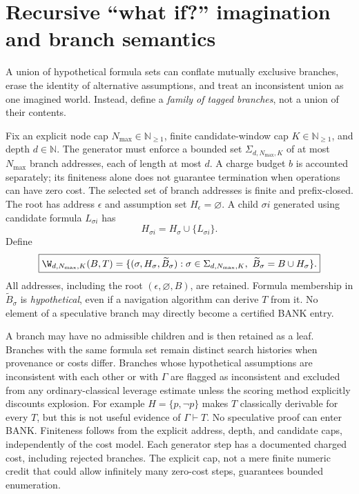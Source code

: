 \section{Recursive ``what if?'' imagination and branch semantics}
A union of hypothetical formula sets can conflate mutually exclusive branches, erase the identity of alternative assumptions, and treat an inconsistent union as one imagined world. Instead, define a \emph{family of tagged branches}, not a union of their contents.
\begin{definition}\label{def:tree}
Fix an explicit node cap $N_{\max}\in\mathbb N_{\ge1}$, finite candidate-window cap $K\in\mathbb N_{\ge1}$, and depth $d\in\mathbb N$. The generator must enforce a bounded set $\Sigma_{d,N_{\max},K}$ of at most $N_{\max}$ branch addresses, each of length at most $d$. A charge budget $b$ is accounted separately; its finiteness alone does not guarantee termination when operations can have zero cost. The selected set of branch addresses is finite and prefix-closed. The root has address $\epsilon$ and assumption set $H_\epsilon=\varnothing$. A child $\sigma i$ generated using candidate formula $L_{\sigma i}$ has
\[H_{\sigma i}=H_\sigma\cup\{L_{\sigma i}\}.\]
Define
\[\boxed{\W_{d,N_{\max},K}(B,T)=\{(\sigma,H_\sigma,\widetilde B_\sigma):\sigma\in\Sigma_{d,N_{\max},K},\ \widetilde B_\sigma=B\cup H_\sigma\}.}\]
All addresses, including the root $(\epsilon,\varnothing,B)$, are retained. Formula membership in $\widetilde B_\sigma$ is \emph{hypothetical}, even if a navigation algorithm can derive $T$ from it. No element of a speculative branch may directly become a certified BANK entry.
\end{definition}
A branch may have no admissible children and is then retained as a leaf. Branches with the same formula set remain distinct search histories when provenance or costs differ. Branches whose hypothetical assumptions are inconsistent with each other or with $\Gamma$ are flagged as inconsistent and excluded from any ordinary-classical leverage estimate unless the scoring method explicitly discounts explosion. For example $H=\{p,\neg p\}$ makes $T$ classically derivable for every $T$, but this is not useful evidence of $\Gamma\vdash T$. No speculative proof can enter BANK. Finiteness follows from the explicit address, depth, and candidate caps, independently of the cost model. Each generator step has a documented charged cost, including rejected branches. The explicit cap, not a mere finite numeric credit that could allow infinitely many zero-cost steps, guarantees bounded enumeration.

